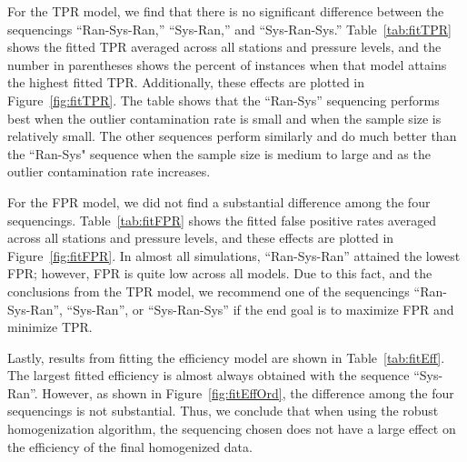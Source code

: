 \documentclass[12pt]{article}
\begin{document}
\begin{doublespacing}
For the TPR model, we find that there is no significant difference between the sequencings ``Ran-Sys-Ran,'' ``Sys-Ran,'' and ``Sys-Ran-Sys.''  Table~\ref{tab:fitTPR} shows the fitted TPR averaged across all stations and pressure levels, and the number in parentheses shows the percent of instances when that model attains the highest fitted TPR.  Additionally, these effects are plotted in Figure~\ref{fig:fitTPR}.  The table shows that the ``Ran-Sys'' sequencing performs best when the outlier contamination rate is small and when the sample size is relatively small.  The other sequences perform  similarly and do much better than the ``Ran-Sys" sequence when the sample size is medium to large and as the outlier contamination rate increases.  

For the FPR model, we did not find a substantial difference among the four sequencings.  Table~\ref{tab:fitFPR} shows the fitted false positive rates averaged across all stations and pressure levels, and these effects are plotted in Figure~\ref{fig:fitFPR}.  In almost all simulations, ``Ran-Sys-Ran'' attained the lowest FPR; however, FPR is quite low across all models.  Due to this fact, and the conclusions from the TPR model, we recommend one of the sequencings ``Ran-Sys-Ran'', ``Sys-Ran'', or ``Sys-Ran-Sys'' if the end goal is to maximize FPR and minimize TPR.

Lastly, results from fitting the efficiency model are shown in Table~\ref{tab:fitEff}.  The largest fitted efficiency is almost always obtained with the sequence ``Sys-Ran''.  However, as shown in Figure~\ref{fig:fitEffOrd}, the difference among the four sequencings is not substantial.  Thus, we conclude that when using the robust homogenization algorithm, the sequencing chosen does not have a large effect on the efficiency of the final homogenized data.



\end{doublespacing}
\end{document}
